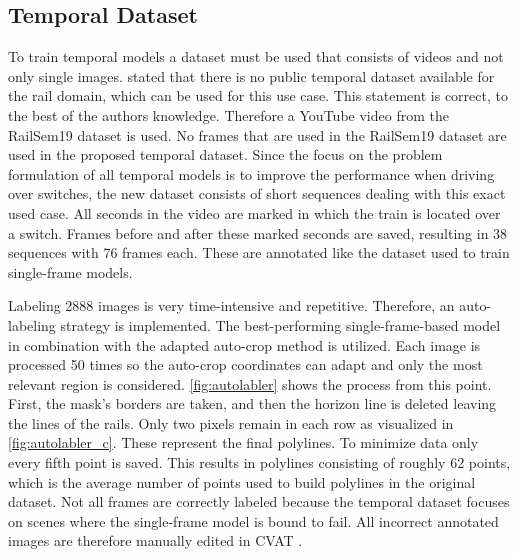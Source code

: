 \subsection{Temporal Dataset}

To train temporal models a dataset must be used that consists of videos and not only single images.
\cite{tepNet2024} stated that there is no public temporal dataset available for the rail domain, which can be used for this use case.
This statement is correct, to the best of the authors knowledge.
Therefore a YouTube video \cite{temporalDataset_youtube_video} from the RailSem19 dataset is used.
No frames that are used in the RailSem19 dataset are used in the proposed temporal dataset.
Since the focus on the problem formulation of all temporal models is to improve the performance when driving over switches, the new dataset consists of short sequences dealing with this exact used case.
All seconds in the video \cite{temporalDataset_youtube_video} are marked in which the train is located over a switch.
Frames before and after these marked seconds are saved, resulting in 38 sequences with 76 frames each. These are annotated like the dataset used to train single-frame models.

Labeling 2888 images is very time-intensive and repetitive.
Therefore, an auto-labeling strategy is implemented.
The best-performing single-frame-based model in combination with the adapted auto-crop method is utilized.
Each image is processed 50 times so the auto-crop coordinates can adapt and only the most relevant region is considered.
\autoref{fig:autolabler} shows the process from this point.
First, the mask's borders are taken, and then the horizon line is deleted leaving the lines of the rails.
Only two pixels remain in each row as visualized in \autoref{fig:autolabler_c}.
These represent the final polylines. To minimize data only every fifth point is saved.
This results in polylines consisting of roughly 62 points, which is the average number of points used to build polylines in the original dataset.
Not all frames are correctly labeled because the temporal dataset focuses on scenes where the single-frame model is bound to fail.
All incorrect annotated images are therefore manually edited in CVAT \cite{cvat}.

